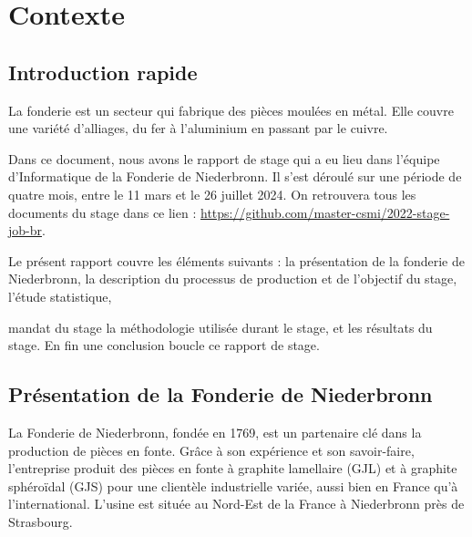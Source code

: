 \documentclass[12pt]{article}
\begin{document}
\newpage

\tableofcontents

\newpage

\section{Contexte }


\subsection{Introduction rapide}



La fonderie est un secteur qui fabrique des pièces moulées en métal. 
Elle couvre une variété d’alliages, du fer à l’aluminium en passant 
par le cuivre.

Dans ce document, nous avons le rapport de stage qui a eu lieu dans l'équipe
d'Informatique de la Fonderie de Niederbronn. Il s'est déroulé sur
une période de quatre mois, entre le 11 mars et le 26 juillet 2024. 
On retrouvera tous les documents du stage dans ce 
lien : \url{https://github.com/master-csmi/2022-stage-job-br}. 


Le présent rapport couvre les éléments suivants : la présentation de 
la fonderie de Niederbronn, la description du processus 
de production et de l'objectif du stage, l'étude statistique,  

mandat du stage la méthodologie utilisée durant le stage, et les résultats du stage. En
fin une conclusion boucle ce rapport de stage.



\subsection{Présentation de la Fonderie de Niederbronn}


La Fonderie de Niederbronn, fondée en 1769, est un partenaire clé dans la production de pièces 
en fonte. Grâce à son expérience et son savoir-faire, l'entreprise produit des pièces en fonte 
à graphite lamellaire (GJL) et à graphite sphéroïdal (GJS) pour une clientèle industrielle variée,
aussi bien en France qu'à l'international. L’usine est située au Nord-Est de la France 
à Niederbronn près de Strasbourg.
\end{document}
